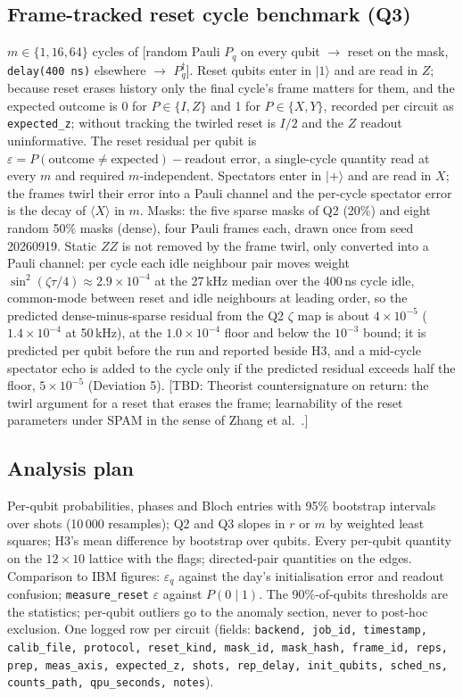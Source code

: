 \documentclass[aps,pra,reprint,superscriptaddress,nofootinbib,longbibliography,amsmath,amssymb]{revtex4-2}
\newcommand{\tbd}[1]{\textcolor{orange!80!black}{[TBD: #1]}}
\newcommand{\eps}{\varepsilon}
\begin{document}
\subsection{Frame-tracked reset cycle benchmark (Q3)}
$m \in \{1, 16, 64\}$ cycles of [random Pauli $P_q$ on every qubit $\to$ reset on the mask, \texttt{delay(400\,ns)} elsewhere $\to$ $P_q^\dagger$]. Reset qubits enter in $|1\rangle$ and are read in $Z$; because reset erases history only the final cycle's frame matters for them, and the expected outcome is 0 for $P \in \{I, Z\}$ and 1 for $P \in \{X, Y\}$, recorded per circuit as \texttt{expected\_z}; without tracking the twirled reset is $I/2$ and the $Z$ readout uninformative. The reset residual per qubit is $\eps = P(\text{outcome} \neq \text{expected}) - \text{readout error}$, a single-cycle quantity read at every $m$ and required $m$-independent. Spectators enter in $|+\rangle$ and are read in $X$; the frames twirl their error into a Pauli channel and the per-cycle spectator error is the decay of $\langle X\rangle$ in $m$. Masks: the five sparse masks of Q2 (20\%) and eight random 50\% masks (dense), four Pauli frames each, drawn once from seed 20260919. Static $ZZ$ is not removed by the frame twirl, only converted into a Pauli channel: per cycle each idle neighbour pair moves weight $\sin^2(\zeta\tau/4) \approx 2.9\times10^{-4}$ at the 27\,kHz median over the 400\,ns cycle idle, common-mode between reset and idle neighbours at leading order, so the predicted dense-minus-sparse residual from the Q2 $\zeta$ map is about $4\times10^{-5}$ ($1.4\times10^{-4}$ at 50\,kHz), at the $1.0\times10^{-4}$ floor and below the $10^{-3}$ bound; it is predicted per qubit before the run and reported beside H3, and a mid-cycle spectator echo is added to the cycle only if the predicted residual exceeds half the floor, $5\times10^{-5}$ (Deviation 5). \tbd{Theorist countersignature on return: the twirl argument for a reset that erases the frame; learnability of the reset parameters under SPAM in the sense of Zhang et al.~\cite{Zhang2025}.}

\subsection{Analysis plan}
Per-qubit probabilities, phases and Bloch entries with 95\% bootstrap intervals over shots (10\,000 resamples); Q2 and Q3 slopes in $r$ or $m$ by weighted least squares; H3's mean difference by bootstrap over qubits. Every per-qubit quantity on the $12\times10$ lattice with the flags; directed-pair quantities on the edges. Comparison to IBM figures: $\eps_q$ against the day's initialisation error and readout confusion; \texttt{measure\_reset} $\eps$ against $P(0\mid1)$. The 90\%-of-qubits thresholds are the statistics; per-qubit outliers go to the anomaly section, never to post-hoc exclusion. One logged row per circuit (fields: \texttt{backend, job\_id, timestamp, calib\_file, protocol, reset\_kind, mask\_id, mask\_hash, frame\_id, reps, prep, meas\_axis, expected\_z, shots, rep\_delay, init\_qubits, sched\_ns, counts\_path, qpu\_seconds, notes}).
\end{document}
